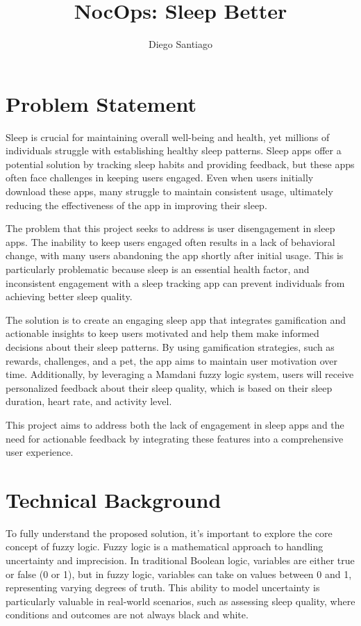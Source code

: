 \documentclass[10pt,twocolumn]{article}
\title{NocOps: Sleep Better}
\author{Diego Santiago}
\affiliation{Occidental College}
\begin{document}
\maketitle

\section{Problem Statement}

Sleep is crucial for maintaining overall well-being and health, yet millions of individuals struggle with establishing healthy sleep patterns. Sleep apps offer a potential solution by tracking sleep habits and providing feedback, but these apps often face challenges in keeping users engaged. Even when users initially download these apps, many struggle to maintain consistent usage, ultimately reducing the effectiveness of the app in improving their sleep.

The problem that this project seeks to address is user disengagement in sleep apps. The inability to keep users engaged often results in a lack of behavioral change, with many users abandoning the app shortly after initial usage. This is particularly problematic because sleep is an essential health factor, and inconsistent engagement with a sleep tracking app can prevent individuals from achieving better sleep quality.

The solution is to create an engaging sleep app that integrates gamification and actionable insights to keep users motivated and help them make informed decisions about their sleep patterns. By using gamification strategies, such as rewards, challenges, and a pet, the app aims to maintain user motivation over time. Additionally, by leveraging a Mamdani fuzzy logic system\cite{mamdani-system}, users will receive personalized feedback about their sleep quality, which is based on their sleep duration, heart rate, and activity level.

This project aims to address both the lack of engagement in sleep apps and the need for actionable feedback by integrating these features into a comprehensive user experience.

\section{Technical Background}

To fully understand the proposed solution, it's important to explore the core concept of fuzzy logic. Fuzzy logic is a mathematical approach to handling uncertainty and imprecision. In traditional Boolean logic, variables are either true or false (0 or 1), but in fuzzy logic, variables can take on values between 0 and 1, representing varying degrees of truth\cite{fuzzy-logic}. This ability to model uncertainty is particularly valuable in real-world scenarios, such as assessing sleep quality, where conditions and outcomes are not always black and white.
\end{document}

